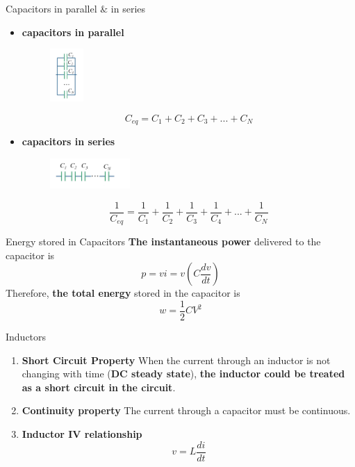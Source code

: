 \documentclass{beamer}
\begin{document}
    \begin{frame}{Capacitors in parallel $\&$ in series}
    \begin{itemize}
        \item \textbf{capacitors in parallel}
        \begin{figure}
        \centering
        \includegraphics[width=0.5in]{ycy/Chap6/f3.jpg}
        \end{figure}
        \begin{equation*}
            C_{eq}=C_1+C_2+C_3+...+C_N
        \end{equation*}
        
        \item \textbf{capacitors in series}
        \begin{figure}
        \centering
        \includegraphics[width=1.2in]{ycy/Chap6/f4.jpg}
        \end{figure}
        \begin{equation*}
            \frac{1}{C_{eq}}=\frac{1}{C_1}+\frac{1}{C_2}+\frac{1}{C_3}+\frac{1}{C_4}+...+\frac{1}{C_N}
        \end{equation*}
        \end{itemize}
    \end{frame}
    
    \begin{frame}{Energy stored in Capacitors}
    \textbf{The instantaneous power} delivered to the capacitor is 
        \begin{equation*}
            p=vi=v(C\frac{dv}{dt})
        \end{equation*}
        Therefore, \textbf{the total energy} stored in the capacitor is 
        \begin{equation*}
            w=\frac{1}{2}CV^2
        \end{equation*}
    \end{frame}
    
    \begin{frame}{Inductors}
    \begin{enumerate}
        \item \textbf{Short Circuit Property} When the current through an inductor is not changing with time (\textbf{DC steady state}), \textbf{the inductor could be treated as a short circuit in the circuit}.
        \item \textbf{Continuity property} The current through a capacitor must be continuous. 
        \item \textbf{Inductor IV relationship} 
        \begin{equation*}
            v=L\frac{di}{dt}
        \end{equation*}
    \end{enumerate}
    \end{frame}
    
\end{document}
